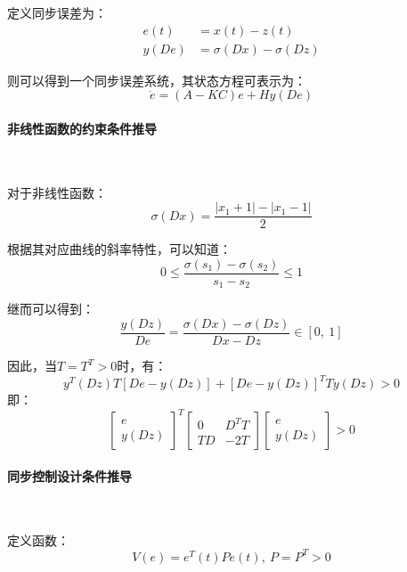 \documentclass[UTF8]{article}
\begin{document}
定义同步误差为：
\begin{align*}
	e(t) &= x(t) - z(t) \\
	y(De) &= \sigma(Dx) - \sigma(Dz)
\end{align*}

则可以得到一个同步误差系统，其状态方程可表示为：
\begin{equation*}
	\dot{e} = (A - KC)e + Hy(De)
\end{equation*}

\paragraph{非线性函数的约束条件推导}~{}

对于非线性函数：
\begin{equation*}
	\sigma(Dx) = \frac{|x_1 + 1| - |x_1 - 1|}{2}
\end{equation*}

根据其对应曲线的斜率特性，可以知道：
\begin{equation*}
	0 \le \frac{\sigma(s_1) - \sigma(s_2)}{s_1 - s_2} \le 1
\end{equation*}

继而可以得到：
\begin{equation*}
	\frac{y(Dz)}{De} = \frac{\sigma(Dx) - \sigma(Dz)}{Dx - Dz} \in [0,\ 1]
\end{equation*}

因此，当$T = T^T > 0$时，有：
\begin{equation*}
	y^T(Dz)T[De - y(Dz)] + [De - y(Dz)]^T Ty(Dz) > 0
\end{equation*}
即：
\begin{equation*}
	\begin{bmatrix}
		e \\
		y(Dz) 
	\end{bmatrix}^T 
	\begin{bmatrix}
		0 & D^T T \\
		TD & -2T
	\end{bmatrix}
	\begin{bmatrix}
		e \\
		y(Dz)
	\end{bmatrix} > 0
\end{equation*}

\paragraph{同步控制设计条件推导}~{}

定义函数：
\begin{equation*}
	V(e) = e^T(t)Pe(t),\ P = P^T > 0
\end{equation*}
\end{document}
